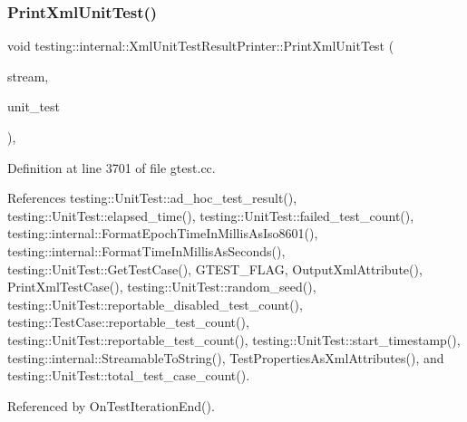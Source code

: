 \subsubsection{\texorpdfstring{Print\+Xml\+Unit\+Test()}{PrintXmlUnitTest()}}
{\footnotesize\ttfamily void testing\+::internal\+::\+Xml\+Unit\+Test\+Result\+Printer\+::\+Print\+Xml\+Unit\+Test (\begin{DoxyParamCaption}\item[{\+::std\+::ostream $\ast$}]{stream,  }\item[{const \hyperlink{classtesting_1_1UnitTest}{Unit\+Test} \&}]{unit\+\_\+test }\end{DoxyParamCaption})\hspace{0.3cm}{\ttfamily [static]}, {\ttfamily [private]}}



Definition at line 3701 of file gtest.\+cc.



References testing\+::\+Unit\+Test\+::ad\+\_\+hoc\+\_\+test\+\_\+result(), testing\+::\+Unit\+Test\+::elapsed\+\_\+time(), testing\+::\+Unit\+Test\+::failed\+\_\+test\+\_\+count(), testing\+::internal\+::\+Format\+Epoch\+Time\+In\+Millis\+As\+Iso8601(), testing\+::internal\+::\+Format\+Time\+In\+Millis\+As\+Seconds(), testing\+::\+Unit\+Test\+::\+Get\+Test\+Case(), G\+T\+E\+S\+T\+\_\+\+F\+L\+AG, Output\+Xml\+Attribute(), Print\+Xml\+Test\+Case(), testing\+::\+Unit\+Test\+::random\+\_\+seed(), testing\+::\+Unit\+Test\+::reportable\+\_\+disabled\+\_\+test\+\_\+count(), testing\+::\+Test\+Case\+::reportable\+\_\+test\+\_\+count(), testing\+::\+Unit\+Test\+::reportable\+\_\+test\+\_\+count(), testing\+::\+Unit\+Test\+::start\+\_\+timestamp(), testing\+::internal\+::\+Streamable\+To\+String(), Test\+Properties\+As\+Xml\+Attributes(), and testing\+::\+Unit\+Test\+::total\+\_\+test\+\_\+case\+\_\+count().



Referenced by On\+Test\+Iteration\+End().


